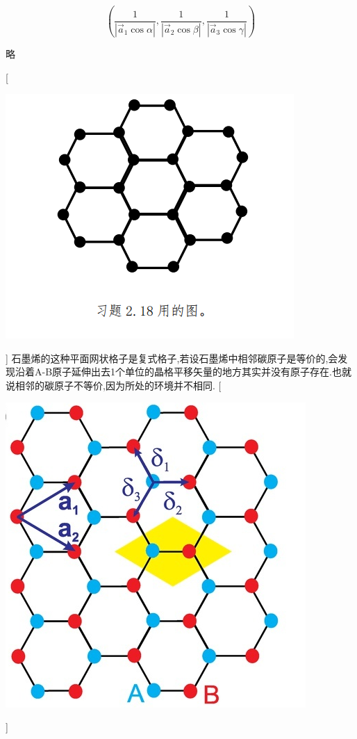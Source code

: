 \documentclass[UTF8,10pt, a4paper, oneside]{ctexart}
\begin{document}
    {\[(\dfrac{1}{|\vec{a}_1 \cos \alpha|},\dfrac{1}{|\vec{a}_2 \cos \beta|},\dfrac{1}{|\vec{a}_3 \cos \gamma|})\]}

    {略}

    [ \begin{center} \includegraphics{picture/2-19-1.png}\end{center}]
    {石墨烯的这种平面网状格子是复式格子,若设石墨烯中相邻碳原子是等价的,会发现沿着A-B原子延伸出去1个单位的晶格平移矢量的地方其实并没有原子存在.也就说相邻的碳原子不等价,因为所处的环境并不相同.}
    [ \begin{center}\includegraphics[scale=0.5]{picture/2-19-2.png} \end{center}]
        
\end{document}
